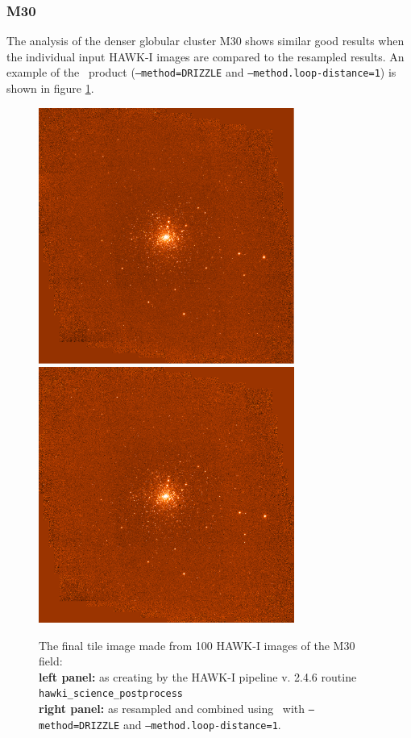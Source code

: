 %  
\subsubsection{M30}

The analysis of the denser globular cluster M30 shows similar good results when the individual input HAWK-I images are compared to the
resampled results.   An example of the \hdrlresample\ product ({\tt --method=DRIZZLE} and {\tt --method.loop-distance=1})
is shown in figure \ref{fig:hawki_M30}.  

\begin{figure}[H]
\centering
\includegraphics[width=8.4cm]{figures/Distortion_M30_TILED_IMAGE.png}
\includegraphics[width=8.4cm]{figures/hdrldemo_resample_DRIZZLE_HAWKI_M30_1.png} 
\caption[]
	{\footnotesize  The final tile image made from 100 HAWK-I images of the M30 field:\\
	{\bf left panel:}    as creating by the HAWK-I pipeline v. 2.4.6 routine {\tt hawki\_science\_postprocess}\\
	{\bf right panel:} as resampled and combined using \hdrlresample\ with {\tt --method=DRIZZLE} and {\tt --method.loop-distance=1}.\\
	}
	\label{fig:hawki_M30}
\end{figure}


